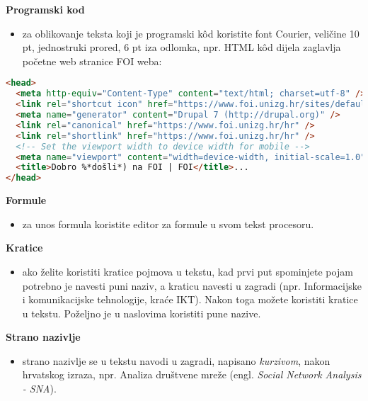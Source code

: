 \begin{flushleft}\textbf{Programski kod}\end{flushleft}
\begin{itemize}
    \item za oblikovanje teksta koji je programski kôd koristite font Courier, veličine 10 pt, jednostruki prored, 6 pt iza odlomka, npr. HTML kôd dijela zaglavlja početne web stranice FOI weba:
\end{itemize}

\begin{lstlisting}[language=HTML]
<head>
  <meta http-equiv="Content-Type" content="text/html; charset=utf-8" />
  <link rel="shortcut icon" href="https://www.foi.unizg.hr/sites/default/files/favicon_0_1.ico" type="image/vnd.microsoft.icon" />
  <meta name="generator" content="Drupal 7 (http://drupal.org)" />
  <link rel="canonical" href="https://www.foi.unizg.hr/hr" />
  <link rel="shortlink" href="https://www.foi.unizg.hr/hr" />
  <!-- Set the viewport width to device width for mobile -->
  <meta name="viewport" content="width=device-width, initial-scale=1.0">
  <title>Dobro %*došli*) na FOI | FOI</title>...
</head>
\end{lstlisting}

\begin{flushleft}\textbf{Formule}\end{flushleft}
\begin{itemize}
    \item za unos formula koristite editor za formule u svom tekst procesoru.
\end{itemize}

\begin{flushleft}\textbf{Kratice}\end{flushleft}
\begin{itemize}
    \item ako želite koristiti kratice pojmova u tekstu, kad prvi put spominjete pojam potrebno je navesti puni naziv, a kraticu navesti u zagradi (npr. Informacijske i komunikacijske tehnologije, kraće IKT). Nakon toga možete koristiti kratice u tekstu. Poželjno je u naslovima koristiti pune nazive.
\end{itemize}

\begin{flushleft}\textbf{Strano nazivlje}\end{flushleft}
\begin{itemize}
    \item strano nazivlje se u tekstu navodi u zagradi, napisano \textit{kurzivom}, nakon hrvatskog izraza, npr. Analiza društvene mreže (engl. \textit{Social Network Analysis - SNA}).
\end{itemize}

